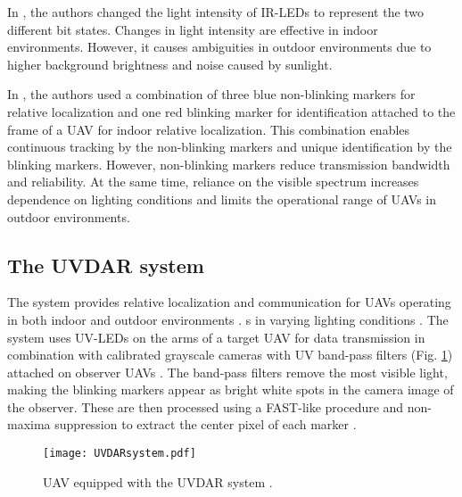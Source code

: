 \documentclass[lettersize,preprint]{elsarticle}
\begin{document}
In \cite{gorseOpticalCameraCommunication2018}, the authors changed the light intensity of \gls{IR}-\glspl{LED} to represent the two different bit states.
Changes in light intensity are effective in indoor environments.
However, it causes ambiguities in outdoor environments due to higher background brightness and noise caused by sunlight.

In \cite{diasOnboardVisionbased3D2016}, the authors used a combination of three blue non-blinking markers for relative localization and one red blinking marker for identification attached to the frame of a \gls{UAV} for indoor relative localization.
This combination enables continuous tracking by the non-blinking markers and unique identification by the blinking markers.
However, non-blinking markers reduce transmission bandwidth and reliability. At the same time, reliance on the visible spectrum increases dependence on lighting conditions and limits the operational range of \glspl{UAV} in outdoor environments.


\subsection{The UVDAR system}\label{sec:uvdar}
The  system provides relative localization and communication for \glspl{UAV} operating in both indoor and outdoor environments \cite{walterUVDARSystemVisual2019, walterFastMutualRelative2018a, walterMutualLocalizationUAVs2018, petracekBioinspiredCompactSwarms2021,horynaUVDARCOMUVBasedRelative2022}.
s in varying lighting conditions \cite{walterFastMutualRelative2018a}.
The system uses \gls{UV}-\glspl{LED} on the arms of a target \gls{UAV} for data transmission in combination with calibrated grayscale cameras with \gls{UV} band-pass filters (Fig. \ref{fig:uav_platform}) attached on observer \glspl{UAV} \cite{liceaOpticalCommunicationbasedIdentification2023}.
The band-pass filters remove the most visible light, making the blinking markers appear as bright white spots in the camera image of the observer.
These are then processed using a \gls{FAST}-like procedure and non-maxima suppression to extract the center pixel of each marker \cite{walterFastMutualRelative2018a,walterMutualLocalizationUAVs2018}. 

\begin{figure}[t]
  \centering
    \texttt{[image: UVDARsystem.pdf]}
      \caption{\gls{UAV} equipped with the UVDAR system \cite{liceaOpticalCommunicationbasedIdentification2023}. }
      \vspace{-5pt}
      \label{fig:uav_platform}%
\end{figure}
\end{document}

